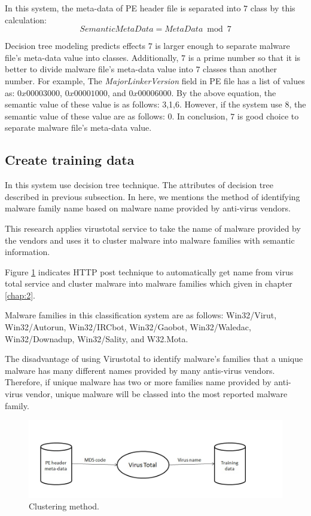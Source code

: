 In this system, the meta-data of PE header file is separated into $7$ class by this calculation:
\begin{equation}
SemanticMetaData = MetaData \bmod 7
\end{equation} 

Decision tree modeling predicts effects $7$ is larger enough to separate malware file's meta-data value into classes. Additionally, $7$ is a prime number so that it is better to divide malware file's meta-data value into $7$ classes than another number. For example, The \emph{MajorLinkerVersion} field in PE file has a list of values as: $0x00003000$, $0x00001000$, and $0x00006000$. By the above equation, the semantic value of these value is as follows: 3,1,6. However, if the system use $8$, the semantic value of these value are as follows: 0. In conclusion, $7$ is good choice to separate malware file's meta-data value.

\subsection{Create training data}

In this system use decision tree technique. The attributes of decision tree described in previous subsection. In here, we mentions the method of identifying malware family name based on malware name provided by anti-virus vendors.

This research applies virustotal service to take the name of malware provided by the vendors and uses it to cluster malware into malware families with semantic information.

Figure \ref{fig:clustering} indicates HTTP post technique to automatically get name from virus total service and cluster malware into malware families which given in chapter \ref{chap:2}.

Malware families in this classification system are as follows: Win32/Virut, Win32/Autorun, Win32/IRCbot, Win32/Gaobot, Win32/Waledac, Win32/Downadup, Win32/Sality, and W32.Mota. 

The disadvantage of using Virustotal to identify malware's families that a unique malware has many different names provided by many antis-virus vendors. Therefore, if unique malware has two or more families name provided by anti-virus vendor, unique malware will be classed into the most reported malware family.
\begin{figure}[h!]
\centering
\includegraphics[width=1\textwidth]{graph/clustering.jpg}
\caption{Clustering method.}
\label{fig:clustering}
\end{figure}

